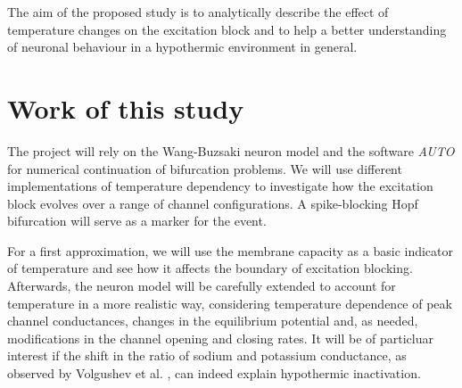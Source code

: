 \documentclass[11pt]{article}
\begin{document}
The aim of the proposed study is to analytically describe the effect of temperature changes on the excitation block and to help a better understanding of neuronal behaviour in a hypothermic environment in general.    



\newpage
\section{Work of this study}

The project will rely on the Wang-Buzsaki neuron model \cite{Wang6402} and the software \textit{AUTO} \cite{Doedel1981} for numerical continuation of bifurcation problems. We will use different implementations of temperature dependency to investigate how the excitation block evolves over a range of channel configurations. A spike-blocking Hopf bifurcation \cite{Hesse2016} will serve as a marker for the event.

For a first approximation, we will use the membrane capacity as a basic indicator of temperature and see how it affects the boundary of excitation blocking. Afterwards, the neuron model will be carefully extended to account for temperature in a more realistic way, considering temperature dependence of peak channel conductances, changes in the equilibrium potential and, as needed, modifications in the channel opening and closing rates. It will be of particluar interest if the shift in the ratio of sodium and potassium conductance, as observed by Volgushev et al. {\cite{Volgushev2000}}, can indeed explain hypothermic inactivation. 



\end{document}

